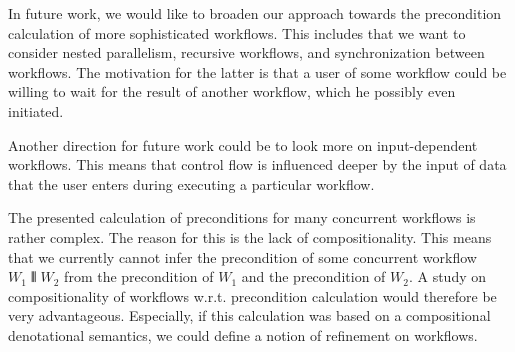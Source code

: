 \documentclass[11pt]{article}
\begin{document}
In future work, we would like to broaden our approach towards the precondition calculation of more sophisticated workflows. This includes that we want to consider nested parallelism, recursive workflows, and synchronization between workflows. The motivation for the latter is that a user of some workflow could be willing to wait for the result of another workflow, which he possibly even initiated.

Another direction for future work could be to look more on input-dependent workflows. This means that control flow is influenced deeper by the input of data that the user enters during executing a particular workflow.

The presented calculation of preconditions for many concurrent workflows is rather complex. The reason for this is the lack of compositionality. This means that we currently cannot infer the precondition of some concurrent workflow $W_1 \interleave W_2$ from the precondition of $W_1$ and the precondition of $W_2$. A study on compositionality of workflows w.r.t. precondition calculation would therefore be very advantageous. Especially, if this calculation was based on a compositional denotational semantics, we could define a notion of refinement on workflows.




\appendix
\end{document}
